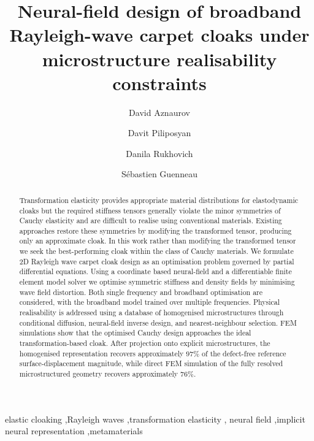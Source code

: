 \documentclass[preprint,12pt]{elsarticle}
\begin{document}
\begin{frontmatter}
\title{Neural-field design of broadband Rayleigh-wave carpet cloaks
under microstructure realisability constraints}

\author[1,2]{David Aznaurov}
\author[1]{Davit Piliposyan}
\author[1]{Danila Rukhovich}
\author[3]{Sébastien Guenneau}


\begin{abstract}

Transformation elasticity provides appropriate material distributions for elastodynamic cloaks but the required stiffness tensors generally violate the minor symmetries of  Cauchy elasticity and are difficult to realise using conventional materials.
Existing approaches restore these symmetries by modifying the transformed tensor, producing only an approximate cloak. 
In this work rather than modifying the transformed tensor we seek the best-performing cloak within the class of Cauchy materials. We formulate 2D Rayleigh wave carpet cloak design as an optimisation problem governed by partial differential equations. Using a coordinate based neural-field and a differentiable finite element model solver we optimise symmetric stiffness and density fields by minimising wave field distortion. Both single frequency and broadband optimisation are considered, with the broadband model trained over multiple frequencies. Physical realisability is addressed using a database of homogenised microstructures through conditional diffusion, neural-field inverse design, and nearest-neighbour selection. FEM simulations show that the optimised Cauchy design approaches the ideal transformation-based cloak. After projection onto explicit  microstructures, the homogenised representation recovers approximately $97\%$ of the defect-free reference surface-displacement magnitude, while direct FEM simulation of the fully resolved microstructured geometry recovers approximately $76\%$.
\end{abstract}

\begin{keyword}
elastic cloaking \sep Rayleigh waves \sep transformation elasticity \sep
neural field \sep implicit neural representation \sep metamaterials
\end{keyword}

\end{frontmatter}
\end{document}
